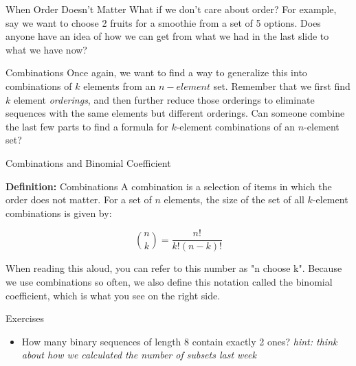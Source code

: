 \documentclass{beamer}
\begin{document}
\begin{frame}{When Order Doesn't Matter}
    What if we don't care about order? For example, say we want to choose 2 fruits for a smoothie from a set of 5 options. Does anyone have an idea of how we can get from what we had in the last slide to what we have now? \vspace{2mm}
    
\end{frame}

\begin{frame}{Combinations}
    Once again, we want to find a way to generalize this into \alert{combinations} of $k$ elements from an $n-element$ set. Remember that we first find $k$ element \textit{orderings}, and then further reduce those orderings to eliminate sequences with the same elements but different orderings. Can someone combine the last few parts to find a formula for $k$-element combinations of an $n$-element set?
    
\end{frame}

\begin{frame}{Combinations and Binomial Coefficient}

    \textbf{Definition:} Combinations \newline
    A combination is a selection of items in which the order does not matter. For a set of $n$ elements, the size of the set of all $k$-element combinations is given by:
    
    \[ \binom{n}{k} = \frac{n!}{k!(n-k)!} \]
    
    When reading this aloud, you can refer to this number as "n choose k". Because we use combinations so often, we also define this notation called the \alert{binomial coefficient}, which is what you see on the right side.
\end{frame}

\begin{frame}{Exercises}
    \begin{itemize}
        \item How many binary sequences of length 8 contain exactly 2 ones? \textit{hint: think about how we calculated the number of subsets last week}
    \end{itemize}
\end{frame}
\end{document}
